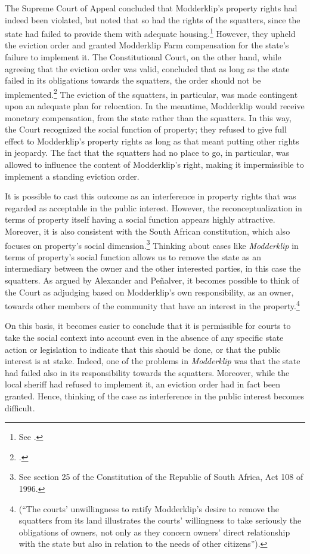 The Supreme Court of Appeal concluded that Modderklip's property rights had indeed been violated, but noted that so had the rights of the squatters, since the state had failed to provide them with adequate housing.\footnote{See \cite{modderklip04}.} However, they upheld the eviction order and granted Modderklip Farm compensation for the state's failure to implement it. The Constitutional Court, on the other hand, while agreeing that the eviction order was valid, concluded that as long as the state failed in its obligations towards the squatters, the order should not be implemented.\footcite{modderklip05} The eviction of the squatters, in particular, was made contingent upon an adequate plan for relocation. In the meantime, Modderklip would receive monetary compensation, from the state rather than the squatters. In this way, the Court recognized the social function of property; they refused to give full effect to Modderklip's property rights as long as that meant putting other rights in jeopardy. The fact that the squatters had no place to go, in particular, was allowed to influence the content of Modderklip's right, making it impermissible to implement a standing eviction order.

It is possible to cast this outcome as an interference in property rights that was regarded as acceptable in the public interest. However, the reconceptualization in terms of property itself having a social function appears highly attractive. Moreover, it is also consistent with the South African constitution, which also focuses on property's social dimension.\footnote{See section 25 of the Constitution of the Republic of South Africa, Act 108 of 1996.} Thinking about cases like {\it Modderklip} in terms of property's social function allows us to remove the state as an intermediary between the owner and the other interested parties, in this case the squatters. As argued by Alexander and Pe\~{n}alver, it becomes possible to think of the Court as adjudging based on Modderklip's own responsibility, as an owner, towards other members of the community that have an interest in the property.\footnote{\cite[157]{alexander11} (``The courts' unwillingness to ratify Modderklip's desire to remove the squatters from its land illustrates the courts' willingness to take seriously the obligations of owners, not only as they concern owners' direct relationship with the state but also in relation to the needs of other citizens'').}

On this basis, it becomes easier to conclude that it is permissible for courts to take the social context into account even in the absence of any specific state action or legislation to indicate that this should be done, or that the public interest is at stake. Indeed, one of the problems in {\it Modderklip} was that the state had failed also in its responsibility towards the squatters. Moreover, while the local sheriff had refused to implement it, an eviction order had in fact been granted. Hence, thinking of the case as interference in the public interest becomes difficult.

